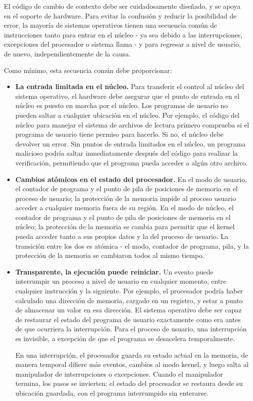 \documentclass[10pt]{book}
\begin{document}
El código de cambio de contexto debe ser cuidadosamente diseñado, y se apoya en el soporte de hardware. Para evitar la confusión y reducir la posibilidad de error, la mayoría de sistemas operativos tienen una secuencia común de instrucciones tanto para entrar en el núcleo - ya sea debido a las interrupciones, excepciones del procesador o sistema llama - y para regresar a nivel de usuario, de nuevo, independientemente de la causa.

Como mínimo, esta secuencia común debe proporcionar:
\begin{itemize}
\item \textbf{La entrada limitada en el núcleo.} Para transferir el control al núcleo del sistema operativo, el hardware debe asegurar que el punto de entrada en el núcleo es puesto en marcha por el núcleo. Los programas de usuario no pueden saltar a cualquier ubicación en el núcleo. Por ejemplo, el código del núcleo para manejar el sistema de archivos de lectura primero comprueba si el programa de usuario tiene permiso para hacerlo. Si no, el núcleo debe devolver un error. Sin puntos de entrada limitados en el núcleo, un programa malicioso podría saltar inmediatamente después del código para realizar la verificación, permitiendo que el programa pueda acceder a algún otro archivo.

\item \textbf{Cambios atómicos en el estado del procesador.} En el modo de usuario, el contador de programa y el punto de pila de posiciones de memoria en el proceso de usuario; la protección de la memoria impide al proceso usuario acceder a cualquier memoria fuera de su región. En el modo de núcleo, el contador de programa y el punto de pila de posiciones de memoria en el núcleo; la protección de la memoria se cambia para permitir que el kernel pueda acceder tanto a sus propios datos y la del proceso de usuario. La transición entre los dos es atómica - el modo, contador de programa, pila, y la protección de la memoria se cambiaron todos al mismo tiempo.

\item \textbf{Transparente, la ejecución puede reiniciar.} Un evento puede interrumpir un proceso a nivel de usuario en cualquier momento, entre cualquier instrucción y la siguiente. Por ejemplo, el procesador podría haber calculado una dirección de memoria, cargado en un registro, y estar a punto de almacenar un valor en esa dirección. El sistema operativo debe ser capaz de restaurar el estado del programa de usuario exactamente como era antes de que ocurriera la interrupción. Para el proceso de usuario, una interrupción es invisible, a excepción de que el programa se desacelera temporalmente.

En una interrupción, el procesador guarda su estado actual en la memoria, de manera temporal difiere más eventos, cambios al modo kernel, y luego salta al manipulador de interrupciones o excepciones. Cuando el manipulador termina, los pasos se invierten: el estado del procesador se restaura desde su ubicación guardada, con el programa interrumpido sin enterarse.
\end{itemize}
\end{document}
